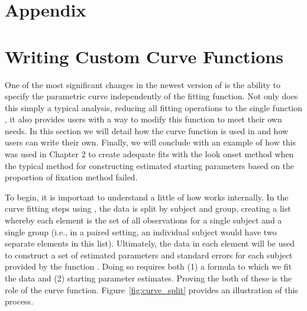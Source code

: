 \section*{Appendix}




\section{Writing Custom Curve Functions}

One of the most significant changes in the newest version of  is the ability to specify the parametric curve independently of the fitting function. Not only does this simply a typical analysis, reducing all fitting operations to the single function , it also provides users with a way to modify this function to meet their own needs. In this section we will detail how the curve function is used in  and how users can write their own. Finally, we will conclude with an example of how this was used in Chapter 2 to create adequate fits with the  look onset method when the typical method for constructing estimated starting parameters based on the proportion of fixation method failed.

To begin, it is important to understand a little of how  works internally. In the curve fitting steps using , the data is split by subject and group, creating a list whereby each element is the set of all observations for a single subject and a single group (i.e., in a paired setting, an individual subject would have two separate elements in this list). Ultimately, the data in each element will be used to construct a set of estimated parameters and standard errors for each subject provided by the function . Doing so requires both (1) a formula to which  we fit the data and (2) starting parameter estimates. Proving the both of these is the role of the curve function. Figure~\ref{fig:curve_split} provides an illustration of this process.




